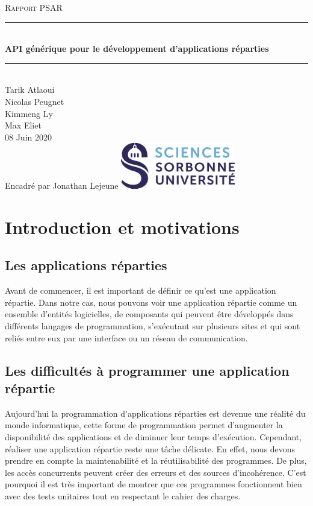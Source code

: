 \documentclass{article}
\date{\today}
\author{Tarik Atlaoui \\ Nicolas Peugnet \\ Kimmeng Ly \\ Max Eliet}
\begin{document}
\begin{titlepage}
	\enlargethispage{2cm}
	\newcommand{\HRule}{\rule{\linewidth}{0.5mm}}
	\center
	\textsc{\LARGE
	Rapport PSAR 
	} \\[1cm]
	\HRule \\[0.4cm]
	{ \huge \bfseries API générique pour le développement d'applications réparties \\[0.15cm] }
	\HRule \\[4cm]
	\large{Tarik Atlaoui \\[3mm] Nicolas Peugnet \\[3mm] Kimmeng Ly \\[3mm] Max Eliet} \\[3cm]
	08 Juin 2020 \\[3cm]
	\large{Encadré par Jonathan Lejeune} \hfill \includegraphics[width=5cm]{logoSU.jpg}
\end{titlepage}

	\newpage
	\tableofcontents
	\newpage


		\section{Introduction et motivations}

			\subsection{Les applications réparties}
			Avant de commencer, il est important de définir ce qu’est une application répartie. Dans notre cas, nous pouvons voir une application répartie comme un ensemble d’entités logicielles, de composants qui peuvent être développés dans différents langages de programmation, s’exécutant sur plusieurs sites et qui sont reliés entre eux par une interface ou un réseau de communication.

			\subsection{Les difficultés à programmer une application répartie}
			 Aujourd’hui la programmation d’applications réparties est devenue une réalité du monde informatique, cette forme de programmation permet d'augmenter la disponibilité des applications et de diminuer leur temps d'exécution. Cependant, réaliser une application répartie reste une tâche délicate. En effet, nous devons prendre en compte la maintenabilité et la réutilisabilité des programmes. De plus, les accès concurrents peuvent créer des erreurs et des sources d'incohérence. C’est pourquoi il est très important de montrer que ces programmes fonctionnent bien avec des tests unitaires tout en respectant le cahier des charges.
\end{document}
